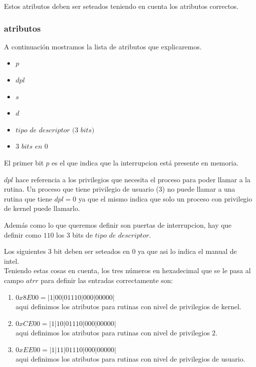 \documentclass[a4paper,10pt,twoside]{article}
\begin{document}
Estos atributos deben ser seteados teniendo en cuenta los atributos correctos.

\subsubsection{atributos}

A continuación mostramos la lista de atributos que explicaremos.
\begin{itemize}
 \item $p$
 \item $dpl$
 \item $s$
 \item $d$
 \item $tipo$ $de$ $descriptor$ $(3$ $bits)$
 \item $3$ $bits$ $en$ $0$
\end{itemize}

El primer bit $p$ es el que indica que la interrupcion está presente en memoria.

$dpl$ hace referencia a los privilegios que necesita el proceso para poder llamar a la rutina. Un proceso que tiene privilegio de usuario ($3$) no puede llamar a una rutina que tiene $dpl = 0$ ya que el mismo indica que solo un proceso con privilegio de kernel puede llamarlo.

Además como lo que queremos definir son puertas de interrupcion, hay que definir como $1 1 0$ los 3 bits de $tipo$ $de$ $descriptor$.

Los siguientes 3 bit deben ser seteados en $0$ ya que asi lo indica el manual de intel.\\

Teniendo estas cosas en cuenta, los tres números en hexadecimal que se le pasa al campo $atrr$ para definir las entradas correctamente son:

\begin{enumerate}
 \item $0x8E00 = | 1 | 0 0 | 0 1 1 1 0 | 0 0 0 | 0 0 0 0 0 | $ \\ aqui definimos los atributos para rutinas con nivel de privilegios de kernel.
 \item $0xCE00 = | 1 | 1 0 | 0 1 1 1 0 | 0 0 0 | 0 0 0 0 0 | $ \\ aqui definimos los atributos para rutinas con nivel de privilegios $2$.
 \item $0xEE00 = | 1 | 1 1 | 0 1 1 1 0 | 0 0 0 | 0 0 0 0 0 | $ \\ aqui definimos los atributos para rutinas con nivel de privilegios de usuario.
\end{enumerate}
\end{document}
